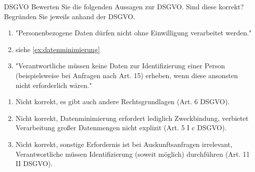 \documentclass{article}
\begin{document}
\begin{exercise}{DSGVO}
  Bewerten Sie die folgenden Aussagen zur DSGVO. Sind diese korrekt? Begründen Sie jeweils anhand der DSGVO.
  \begin{enumerate}
    \item "Personenbezogene Daten dürfen nicht ohne Einwilligung verarbeitet werden."
    \item siehe \ref{ex:datenminimierung}
    \item "Verantwortliche müssen keine Daten zur Identifizierung einer Person (beispielsweise bei Anfragen nach Art. 15) erheben, wenn diese ansonsten nicht erforderlich wären."
  \end{enumerate}

  \begin{solution}
    \begin{enumerate}
      \item Nicht korrekt, es gibt auch andere Rechtsgrundlagen (Art. 6 DSGVO).
      \item Nicht korrekt, Datenminimierung erfordert lediglich Zweckbindung, verbietet Verarbeitung großer Datenmengen nicht explizit (Art. 5 I c DSGVO).
      \item Nicht korrekt, sonstige Erfordernis ist bei Auskunftsanfragen irrelevant, Verantwortliche müssen Identifizierung (soweit möglich) durchführen (Art. 11 II DSGVO).
    \end{enumerate}
  \end{solution}
\end{exercise}
\end{document}
